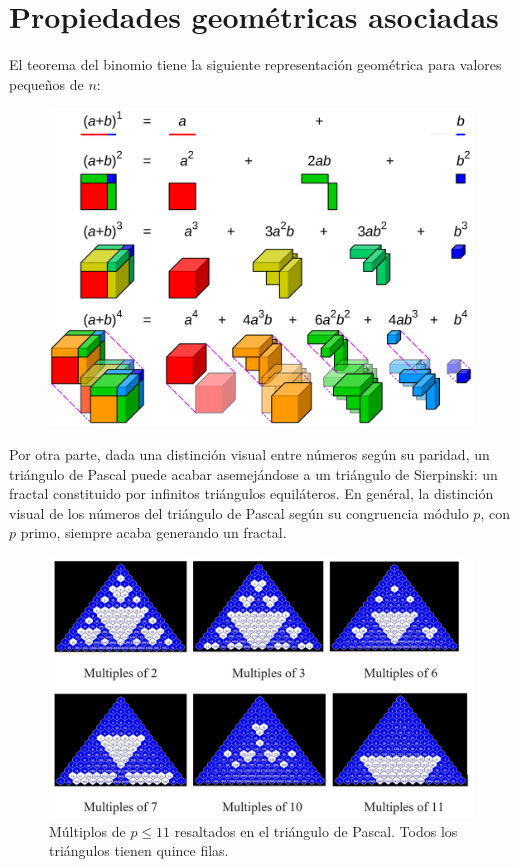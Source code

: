 \documentclass{article}
\theoremstyle{definition}
\begin{document}
\clearpage
\section{Propiedades geométricas asociadas}
El teorema del binomio tiene la siguiente representación geométrica para valores pequeños de $n$:
\begin{figure}[!htbp]
\begin{center}
\includegraphics[scale=0.06]{binomial1.png}
\caption{\citep{misc1}}
\end{center}
\end{figure}



Por otra parte, dada una distinción visual entre números según su paridad, un triángulo de Pascal puede acabar asemejándose a un triángulo de Sierpinski: un fractal constituido por infinitos triángulos equiláteros. En genéral, la distinción visual de los números del triángulo de Pascal según su congruencia módulo $p$, con $p$ primo, siempre acaba generando un fractal. 
\citep{1708.07429}

\begin{figure}[!htbp]
\begin{center}
\includegraphics[scale=0.51]{pascal1.jpg}
\caption{Múltiplos de $p \leq 11$ resaltados en el triángulo de Pascal. Todos los triángulos tienen quince filas. \citep{Pascal}}
\end{center}
\end{figure}
\end{document}
